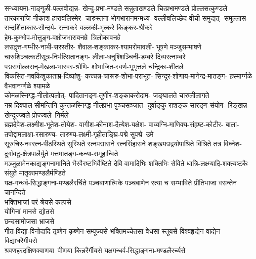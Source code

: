 \begin{multicols}{2}
\begin{flushleft}
सन्ध्यायमा-नाङ्गुळी-पल्लवोद्यन्न-
खेन्दु-प्रभा-मण्डले सन्नुताखण्डले
चित्प्रभामण्डले प्रोल्लसत्कुण्डले\\
\medskip
तारकाराजि-नीकाश-हारावलिस्मेर-
चारुस्तना-भोगभारानमन्मध्य-
वल्लीवलिच्छेद-वीची-समुद्यत्-
समुल्लास-सन्दर्शिताकार-सौन्दर्य-
रत्नाकरे वल्लकी-भृत्करे किङ्कर-श्रीकरे\\
\medskip
हेम-कुम्भोप-मोत्तुङ्ग-वक्षोजभारावनम्रे~त्रिलोकावनम्रे\\
\medskip
लसद्वृत्त-गम्भीर-नाभी-सरस्तीर-
शैवाल-शङ्काकर-श्यामरोमावली-
भूषणे मञ्जुसम्भाषणे\\
\medskip
चारुशिञ्चत्कटीसूत्र-निर्भत्सितानङ्ग-
लीला-धनुश्शिञ्चिनी-डम्बरे दिव्यरत्नाम्बरे\\
\medskip
पद्मरागोल्लसन्-मेखला-भास्वर-श्रोणि-
शोभाजित-स्वर्ण-भूभृत्तले चन्द्रिका-शीतले\\
\medskip
विकसित-नवकिंशुकाताम्र-दिव्यांशु-
कच्चन्न-चारूरु-शोभा-पराभूत-
सिन्दूर-शोणाय-मानेन्द्र-मातङ्ग-
हस्मार्ग्गळे वैभवानर्ग्गळे श्यामळे\\
\medskip
कोमळस्निग्द्ध-नीलोत्पलोत्-
पादितानङ्ग-तूणीर-शङ्काकरोदाम-
जङ्घालते चारुलीलागते\\
\medskip
नम्र-दिक्पाल-सीमन्तिनि
कुन्तळस्निग्द्ध-नीलप्रभा-पुञ्चसञ्जात-
दुर्वाङ्कु-राशङ्क-सारङ्ग-संयोग-
रिङ्खन्न-खेन्दूज्ज्वले प्रोज्ज्वले~निर्मले\\
\medskip
ब्रह्मदेवेश-लक्ष्मीश-भूतेश-तोयेश-
वागीश-कीनाश-दैत्येश-यक्षेश-
वाय्वग्नि-माणिक्य-संहृष्ट-कोटीर-
बाला-तपोद्दामलाक्षा-रसारुण्य-
तारुण्य-लक्ष्मी-गृहीताङ्घ्रि-पद्मे
सुपद्मे~उमे\\
\medskip
सूरुचिर-नवरत्न-पीठस्थिते सुस्थिते
रत्नपद्मासने रत्नसिंहासने 
शङ्खपद्मद्वयोपाश्रिते विश्रिते
तत्र विघ्नेश-दुर्गावटु-क्षेत्रपालैर्युते
मत्तमातङ्ग-कन्या-समूहान्विते\\
\medskip
मञ्जुळामेनकाद्यङ्गनामानिते
भैरवैरष्टभिर्वेष्टिते देवि 
वामादिभिः शक्तिभिः सेविते 
धात्रि-लक्ष्म्यादि-शक्त्यष्टकैः संयुते
मातृकामण्डलैर्मण्डिते\\
\medskip
यक्ष-गन्धर्व-सिद्धाङ्गना-मण्डलैरर्चिते
पञ्चबाणात्मिके पञ्चबाणेन रत्या च सम्भाविते
प्रीतिभाजा वसन्तेन चानन्दिते\\
\medskip
भक्तिभाजां परं श्रेयसे कल्पसे\\
योगिनां मानसे द्योतसे\\
छन्दसामोजसा भ्राजसे\\
गीत-विद्या-विनोदादि तृष्णेन कृष्णेन सम्पूज्यसे
भक्तिमच्चेतसा वेधसा स्तूयसे
विश्वहृद्येन वाद्येन विद्याधरैर्गीयसे\\
\medskip
श्रवणहरदक्षिणक्वाणया~वीणया 
किन्नरैर्गीयसे यक्षगन्धर्व-सिद्धाङ्गना-मण्डलैरर्च्यसे\\

\end{flushleft}
\end{multicols}
